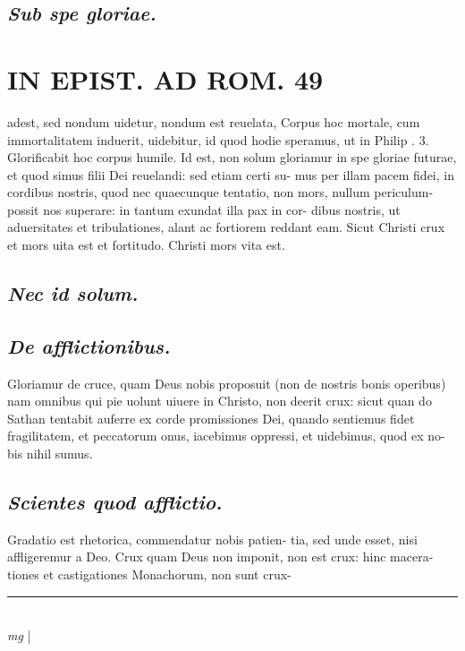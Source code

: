 \documentclass{article}
\begin{document}
\begin{pages}
\subsection*{\textit{Sub spe gloriae. }}
\section*{IN EPIST. AD ROM.  49 }
\marginpar{[ p.]}\pstart adest, sed nondum uidetur, nondum est reuelata, Corpus hoc mortale, cum immortalitatem induerit, uidebitur, id quod hodie speramus, ut in Philip . 3.  Glorificabit hoc corpus humile.   \pend\pstart Id est, non solum gloriamur in spe gloriae futurae, et quod simus filii Dei reuelandi: sed etiam certi su- mus per illam pacem fidei, in cordibus nostris, quod nec quaecunque tentatio, non mors, nullum periculum- possit nos superare: in tantum exundat illa pax in cor- dibus nostris, ut aduersitates et tribulationes, alant ac fortiorem reddant eam. Sicut Christi crux et mors uita est et fortitudo.  Christi mors vita est.  \pend
{}
{}
\subsection*{\textit{Nec id solum. }}
{}
\subsection*{\textit{De afflictionibus. }}\pstart Gloriamur de cruce, quam Deus nobis proposuit (non de nostris bonis operibus) nam omnibus qui pie uolunt uiuere in Christo, non deerit crux: sicut quan do Sathan tentabit auferre ex corde promissiones Dei, quando sentiemus fidet fragilitatem, et peccatorum onus, iacebimus oppressi, et uidebimus, quod ex no- bis nihil sumus.   \pend
{}
{}
\subsection*{\textit{Scientes quod afflictio. }}\pstart Gradatio est rhetorica, commendatur nobis patien- tia, sed unde esset, nisi affligeremur a Deo. Crux quam Deus non imponit, non est crux: hinc macera- tiones et castigationes Monachorum, non sunt crux-  \pend
\vspace{0.5cm}\noindent
\vspace{0.2cm}\rule{1cm}{0.2pt}\\ 
\hspace{0.2cm}\textit{mg}
\footnotesize 
\normalsize| 

\end{pages}
\end{document}
